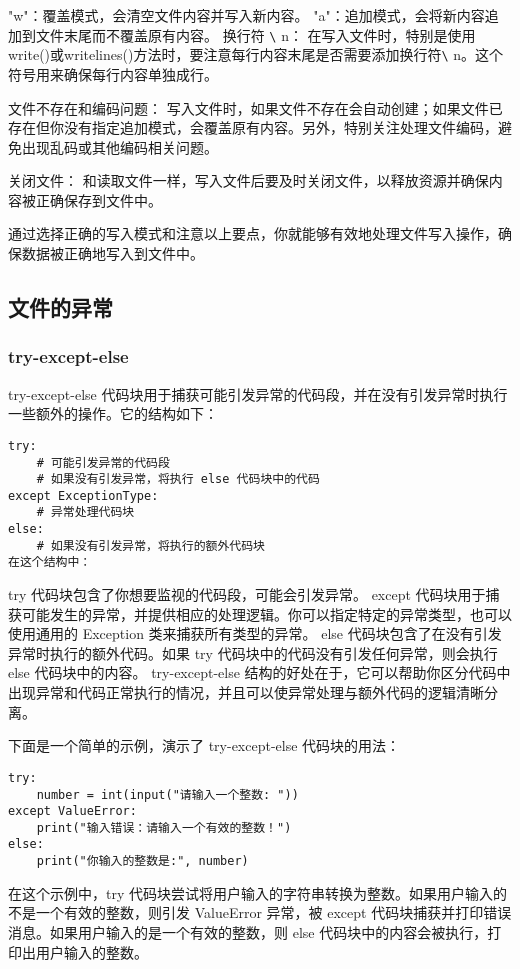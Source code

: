 \documentclass{article}
\begin{document}
"w"：覆盖模式，会清空文件内容并写入新内容。
"a"：追加模式，会将新内容追加到文件末尾而不覆盖原有内容。
换行符 \verb|\| n： 在写入文件时，特别是使用write()或writelines()方法时，要注意每行内容末尾是否需要添加换行符\verb|\| n。这个符号用来确保每行内容单独成行。

文件不存在和编码问题： 写入文件时，如果文件不存在会自动创建；如果文件已存在但你没有指定追加模式，会覆盖原有内容。另外，特别关注处理文件编码，避免出现乱码或其他编码相关问题。

关闭文件： 和读取文件一样，写入文件后要及时关闭文件，以释放资源并确保内容被正确保存到文件中。

通过选择正确的写入模式和注意以上要点，你就能够有效地处理文件写入操作，确保数据被正确地写入到文件中。
\subsection{文件的异常}
\subsubsection{try-except-else}
try-except-else 代码块用于捕获可能引发异常的代码段，并在没有引发异常时执行一些额外的操作。它的结构如下：
\begin{lstlisting}[caption={示例Python代码}]
try:
    # 可能引发异常的代码段
    # 如果没有引发异常，将执行 else 代码块中的代码
except ExceptionType:
    # 异常处理代码块
else:
    # 如果没有引发异常，将执行的额外代码块
在这个结构中：
\end{lstlisting}
try 代码块包含了你想要监视的代码段，可能会引发异常。
except 代码块用于捕获可能发生的异常，并提供相应的处理逻辑。你可以指定特定的异常类型，也可以使用通用的 Exception 类来捕获所有类型的异常。
else 代码块包含了在没有引发异常时执行的额外代码。如果 try 代码块中的代码没有引发任何异常，则会执行 else 代码块中的内容。
try-except-else 结构的好处在于，它可以帮助你区分代码中出现异常和代码正常执行的情况，并且可以使异常处理与额外代码的逻辑清晰分离。

下面是一个简单的示例，演示了 try-except-else 代码块的用法：
\begin{lstlisting}[caption={示例Python代码}]
try:
    number = int(input("请输入一个整数: "))
except ValueError:
    print("输入错误：请输入一个有效的整数！")
else:
    print("你输入的整数是:", number)
\end{lstlisting}
在这个示例中，try 代码块尝试将用户输入的字符串转换为整数。如果用户输入的不是一个有效的整数，则引发 ValueError 异常，被 except 代码块捕获并打印错误消息。如果用户输入的是一个有效的整数，则 else 代码块中的内容会被执行，打印出用户输入的整数。
\end{document}
